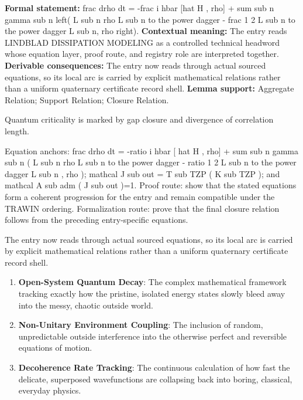 \begingroup\footnotesize\setlength{\emergencystretch}{3em}\sloppy
\textbf{Formal statement:} frac drho dt = -frac i hbar [hat H , rho] + sum sub n gamma sub n left( L sub n rho L sub n to the power dagger - frac 1 2 L sub n to the power dagger L sub n, rho right). \textbf{Contextual meaning:} The entry reads LINDBLAD DISSIPATION MODELING as a controlled technical headword whose equation layer, proof route, and registry role are interpreted together. \textbf{Derivable consequences:} The entry now reads through actual sourced equations, so its local arc is carried by explicit mathematical relations rather than a uniform quaternary certificate record shell. \textbf{Lemma support:} Aggregate Relation; Support Relation; Closure Relation.\par
\endgroup

Quantum criticality is marked by gap closure and divergence of correlation length.

Equation anchors: frac drho dt = -ratio i hbar [ hat H , rho] + sum sub n gamma sub n ( L sub n rho L sub n to the power dagger - ratio 1 2 L sub n to the power dagger L sub n , rho ); mathcal J sub out = T sub TZP ( K sub TZP ); and mathcal A sub adm ( J sub out )=1. Proof route: show that the stated equations form a coherent progression for the entry and remain compatible under the TRAWIN ordering. Formalization route: prove that the final closure relation follows from the preceding entry-specific equations.

The entry now reads through actual sourced equations, so its local arc is carried by explicit mathematical relations rather than a uniform quaternary certificate record shell.
\endgroup

\begin{enumerate}[leftmargin=1.6em,itemsep=6pt,topsep=4pt]
\item \textbf{Open-System Quantum Decay}: The complex mathematical framework tracking exactly how the pristine, isolated energy states slowly bleed away into the messy, chaotic outside world.
\item \textbf{Non-Unitary Environment Coupling}: The inclusion of random, unpredictable outside interference into the otherwise perfect and reversible equations of motion.
\item \textbf{Decoherence Rate Tracking}: The continuous calculation of how fast the delicate, superposed wavefunctions are collapsing back into boring, classical, everyday physics.
\end{enumerate}

